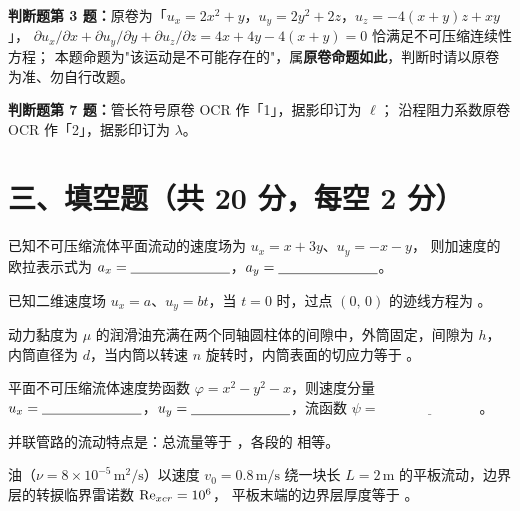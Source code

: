 \begin{tishi}
\textbf{判断题第 3 题：}原卷为「$u_x=2x^{2}+y$，$u_y=2y^{2}+2z$，$u_z=-4(x+y)z+xy$」，
$\partial u_x/\partial x+\partial u_y/\partial y+\partial u_z/\partial z=4x+4y-4(x+y)=0$ 恰满足不可压缩连续性方程；
本题命题为"该运动是不可能存在的"，属\textbf{原卷命题如此}，判断时请以原卷为准、勿自行改题。

\textbf{判断题第 7 题：}管长符号原卷 OCR 作「1」，据影印订为 $\ell$；
沿程阻力系数原卷 OCR 作「2」，据影印订为 $\lambda$。
\end{tishi}

\section{三、填空题（共 20 分，每空 2 分）}

\begin{ti}
  \item 已知不可压缩流体平面流动的速度场为 $u_x=x+3y$、$u_y=-x-y$，
  则加速度的欧拉表示式为 $a_x=\underline{\hspace{2.5cm}}$，$a_y=\underline{\hspace{2.5cm}}$。
  \hfill{}

  \item 已知二维速度场 $u_x=a$、$u_y=bt$，当 $t=0$ 时，过点 $(0,\,0)$ 的迹线方程为
  \underline{\hspace{3.5cm}}。\hfill{}

  \item 动力黏度为 $\mu$ 的润滑油充满在两个同轴圆柱体的间隙中，外筒固定，间隙为 $h$，
  内筒直径为 $d$，当内筒以转速 $n$ 旋转时，内筒表面的切应力等于 \underline{\hspace{3cm}}。
  \hfill{}

  \item 平面不可压缩流体速度势函数 $\varphi=x^{2}-y^{2}-x$，则速度分量
  $u_x=\underline{\hspace{2.5cm}}$，$u_y=\underline{\hspace{2.5cm}}$，流函数 $\psi=\underline{\hspace{3cm}}$。
  \hfill{}

  \item 并联管路的流动特点是：总流量等于 \underline{\hspace{2.8cm}}，各段的 \underline{\hspace{2.8cm}} 相等。
  \hfill{}

  \item 油（$\nu=8\times10^{-5}\,\mathrm{m^2/s}$）以速度 $v_0=0.8\,\mathrm{m/s}$ 绕一块长
  $L=2\,\mathrm{m}$ 的平板流动，边界层的转捩临界雷诺数 $\mathrm{Re}_{xcr}=10^{6}$，
  平板末端的边界层厚度等于 \underline{\hspace{2.5cm}}。\hfill{}
\end{ti}

